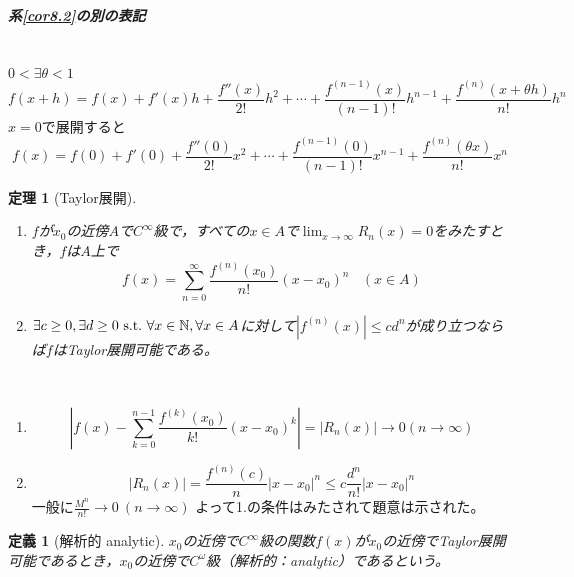 \documentclass[dvipdfmx,a4j,10pt]{jsarticle}
\makeatletter
\theoremstyle{mystyle1}
\newtheorem{thm}[dfn]{定理}
\theoremstyle{mystyle2}
\newtheorem{dfn*}{定義}
\renewenvironment{proof}[1][\proofname]{\par
  \pushQED{\qed}%
  \normalfont
  \topsep6\p@\@plus6\p@ \trivlist
  \item[\hskip\labelsep{\bfseries\sffamily #1}]\ignorespaces
}{%
  \popQED\endtrivlist\@endpefalse
}
\renewcommand\proofname{証明}
\makeatother
\begin{document}
\newpage

\begin{framed}
    \subparagraph{系\ref{cor8.2}の別の表記}\
    \\
    $0<\exists \theta <1$
    \[
    f(x+h)=f(x)+f'(x)h+\frac{f''(x)}{2!}h^2+\cdots+\frac{f^{(n-1)}(x)}{(n-1)!}h^{n-1}+\frac{f^{(n)}(x+\theta h)}{n!}h^n
    \]
    $x=0$で展開すると
    \[
    f(x)=f(0)+f'(0)+\frac{f''(0)}{2!}x^2+\cdots+\frac{f^{(n-1)}(0)}{(n-1)!}x^{n-1}+\frac{f^{(n)}(\theta x)}{n!}x^n
    \]
\end{framed}

\begin{framed}
    \begin{thm}[Taylor展開]\label{thm8.3}\
        \vspace{-\baselineskip}
        \begin{enumerate}
            \item
            $f$が$x_0$の近傍$A$\footnotemark で$C^\infty$級で，すべての$x\in A$で$\displaystyle \lim_{x\to\infty}R_n(x)=0$をみたすとき，$f$は$A$上で
            \[
            f(x)=\sum_{n=0}^\infty \frac{f^{(n)}(x_0)}{n!}(x-x_0)^n\ \ \ \ (x\in A)
            \]
            \item
            $\exists c\geq 0,\exists d\geq 0 \ {\rm s.t.\ }\forall x\in\mathbb{N},\forall x\in A$に対して$|f^{(n)}(x)|\leq cd^n$が成り立つならば$f$はTaylor展開可能である。
        \end{enumerate}
    \end{thm}
\end{framed}

\begin{proof}[定理\ref{thm8.3}の証明]\
\begin{enumerate}
\item
\[
\left|f(x)-\sum_{k=0}^{n-1}\frac{f^{(k)}(x_0)}{k!}(x-x_0)^k\right|=|R_n(x)|\to 0 (n\to\infty)
\]

\item
\[
|R_n(x)|=\frac{f^{(n)}(c)}{n}|x-x_0|^n\leq c\frac{d^n}{n!}|x-x_0|^n
\]
一般に$\displaystyle \frac{M^n}{n!}\to0\ (n\to\infty)$
よって1.の条件はみたされて題意は示された。
\end{enumerate}
\end{proof}

\begin{dfn*}[解析的 analytic]
    $x_0$の近傍で$C^\infty$級の関数$f(x)$が$x_0$の近傍でTaylor展開可能であるとき，$x_0$の近傍で$C^\omega$級（解析的：analytic）であるという。
\end{dfn*}
\end{document}
